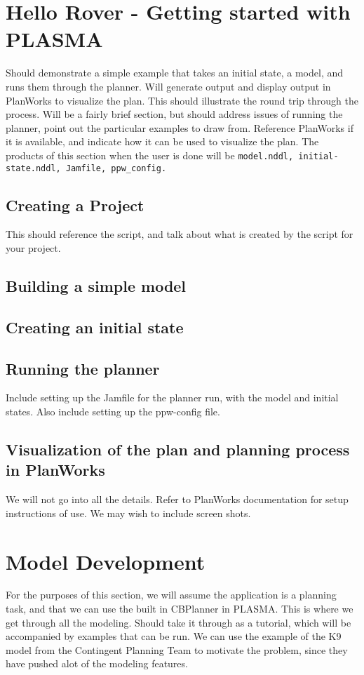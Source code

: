 \documentclass[10pt, letterpaper, twoside]{article}
\begin{document}
\section{Hello Rover - Getting started with PLASMA}
Should demonstrate a simple example that takes an initial state, a
model, and runs them through the planner. Will generate output and
display output in PlanWorks to visualize the plan. This should
illustrate the round trip through the process. Will be a fairly brief
section, but should address issues of running the planner, point out
the particular examples to draw from. Reference PlanWorks if it is
available, and indicate how it can be used to visualize the plan. The
products of this section when the user is done will be
\verb!model.nddl, initial-state.nddl, Jamfile, ppw_config.!

\subsection{Creating a Project}
This should reference the script, and talk about what is created by
the script for your project.
\subsection{Building a simple model}
\subsection{Creating an initial state}
\subsection{Running the planner}
Include setting up the Jamfile for the planner run, with the model and
initial states. Also include setting up the ppw-config file.
\subsection{Visualization of the plan and planning process in PlanWorks}
We will not go into all the details. Refer to PlanWorks documentation
for setup instructions of use. We may wish to include screen shots.

\section{Model Development}
For the purposes of this section, we will assume the application is a
planning task, and that we can use the built in CBPlanner in PLASMA.
This is where we get through all the modeling. Should take it through
as a tutorial, which will be accompanied by examples that can be
run. We can use the example of the K9 model from the Contingent
Planning Team to motivate the problem, since they have pushed alot of
the modeling features.
\end{document}
